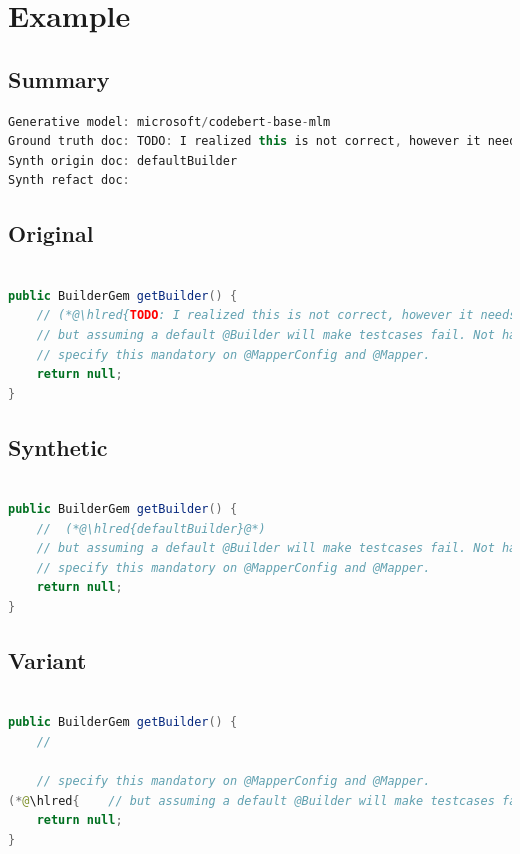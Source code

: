 \documentclass[usenames,dvipsnames]{article} %
\DeclareRobustCommand{\hlred}[1]{{\sethlcolor{pink}\hl{#1}}}
\begin{document}
\pagebreak
\section{Example}
\subsection{Summary}

\begin{lstlisting}[language=java]
Generative model: microsoft/codebert-base-mlm
Ground truth doc: TODO: I realized this is not correct, however it needs to be null in order to keep downward compatibility
Synth origin doc: defaultBuilder
Synth refact doc:
\end{lstlisting}

\subsection{Original}
\begin{lstlisting}[language=java]

public BuilderGem getBuilder() {
    // (*@\hlred{TODO: I realized this is not correct, however it needs to be null in order to keep downward compatibility}@*)
    // but assuming a default @Builder will make testcases fail. Not having a default means that you need to
    // specify this mandatory on @MapperConfig and @Mapper.
    return null;
}
\end{lstlisting}
\subsection{Synthetic}

\begin{lstlisting}[language=java]

public BuilderGem getBuilder() {
    //  (*@\hlred{defaultBuilder}@*)
    // but assuming a default @Builder will make testcases fail. Not having a default means that you need to
    // specify this mandatory on @MapperConfig and @Mapper.
    return null;
}
\end{lstlisting}

\subsection{Variant}

\begin{lstlisting}[language=java]

public BuilderGem getBuilder() {
    //

    // specify this mandatory on @MapperConfig and @Mapper.
(*@\hlred{    // but assuming a default @Builder will make testcases fail. Not having a default means that you need to}@*)
    return null;
}
\end{lstlisting}
\end{document}
